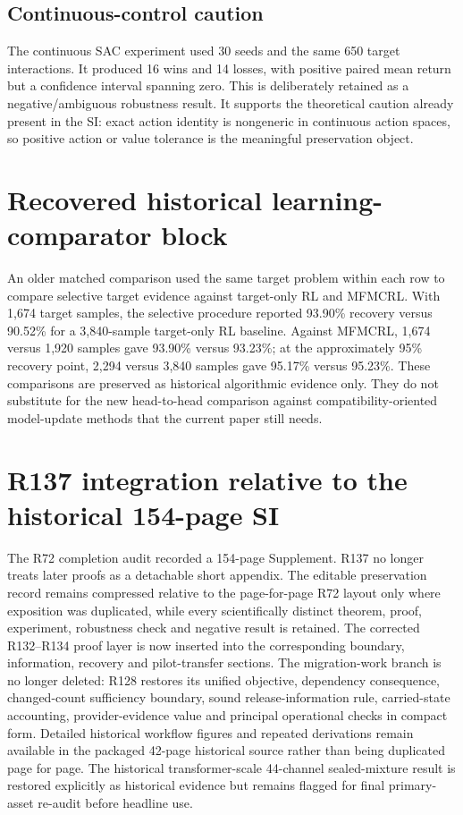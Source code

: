 \documentclass[11pt,letterpaper]{article}
\theoremstyle{plain}
\newcommand{\1}{\mathbf 1}
\begin{document}
\subsection{Continuous-control caution}
The continuous SAC experiment used 30 seeds and the same 650 target interactions. It produced 16 wins and 14 losses, with positive paired mean return but a confidence interval spanning zero. This is deliberately retained as a negative/ambiguous robustness result. It supports the theoretical caution already present in the SI: exact action identity is nongeneric in continuous action spaces, so positive action or value tolerance is the meaningful preservation object.

\section{Recovered historical learning-comparator block}
An older matched comparison used the same target problem within each row to compare selective target evidence against target-only RL and MFMCRL. With 1,674 target samples, the selective procedure reported 93.90\% recovery versus 90.52\% for a 3,840-sample target-only RL baseline. Against MFMCRL, 1,674 versus 1,920 samples gave 93.90\% versus 93.23\%; at the approximately 95\% recovery point, 2,294 versus 3,840 samples gave 95.17\% versus 95.23\%. These comparisons are preserved as historical algorithmic evidence only. They do not substitute for the new head-to-head comparison against compatibility-oriented model-update methods that the current paper still needs.


\section{R137 integration relative to the historical 154-page SI}
The R72 completion audit recorded a 154-page Supplement. R137 no longer treats later proofs as a detachable short appendix. The editable preservation record remains compressed relative to the page-for-page R72 layout only where exposition was duplicated, while every scientifically distinct theorem, proof, experiment, robustness check and negative result is retained. The corrected R132--R134 proof layer is now inserted into the corresponding boundary, information, recovery and pilot-transfer sections. The migration-work branch is no longer deleted: R128 restores its unified objective, dependency consequence, changed-count sufficiency boundary, sound release-information rule, carried-state accounting, provider-evidence value and principal operational checks in compact form. Detailed historical workflow figures and repeated derivations remain available in the packaged 42-page historical source rather than being duplicated page for page. The historical transformer-scale 44-channel sealed-mixture result is restored explicitly as historical evidence but remains flagged for final primary-asset re-audit before headline use.
\end{document}
